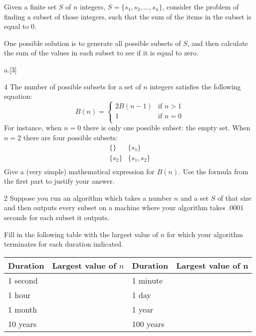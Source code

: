 \item[6] Given a finite set $S$ of $n$ integers, $S=\{s_1, s_2, \ldots, s_n\}$, consider the problem of finding a subset of those integers, such that the sum of the items in the subset is equal to 0.

One possible solution is to generate all possible subsets of $S$, and then calculate the sum of the values in each subset to see if it is equal to zero.

\begin{question}{a.}[3]
    \item[4] The number of possible subsets for a set of $n$ integers satisfies the following equation:
    \[
          B(n)= \begin{cases}
          2 B(n-1) & \textrm{if }n > 1\\
          1 & \textrm{if }n = 0\\
          \end{cases}
    \]
    For instance, when $n=0$ there is only one possible subset: the empty set.
    When $n = 2$ there are four possible subsets:
    \[
      \begin{array}{ll}
      \{  \} &
      \{ s_1 \} \\
      \{ s_2 \} &
      \{ s_1, s_2 \} \\
      \end{array}
    \]
    Give a (very  simple) mathematical expression for $B(n)$. Use the formula from the first part to justify your answer.
    \begin{Questions}
    \vfill
    \end{Questions}
    
    \item[2] Suppose you run an algorithm which takes a number $n$ and a set $S$ of that size and then outputs every subset on a machine where your algorithm takes $.0001$ seconds for each subset it outputs. 
    
    Fill in the following table with the largest value of $n$ for which your algorithm terminates for each duration indicated.\bigskip
    
    \setlength{\extrarowheight}{0.3cm}
    \begin{tabular}{|l|c||l|c|}\hline
    Duration & Largest value of $n$ & Duration & Largest value of n \\ \hline
    1 second &  &
    1 minute & \\ \hline
    1 hour & &
    1 day & \\ \hline
    1 month & &
    1 year & \\ \hline 
    10 years & &
    100 years & \\ \hline
    \end{tabular}
    
\end{question}

